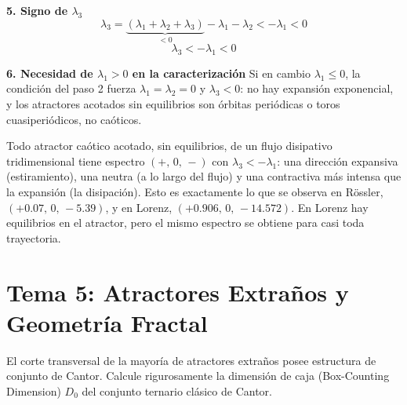 \documentclass[11pt,a4paper]{article}
\newenvironment{solucion}[1][Solución Detallada]{%
    \vspace{1.5mm}%
    \noindent{\large\textbf{Solución:}}\par\vspace{1.5mm}%
}{%
    \par\vspace{3mm}%
}
\newenvironment{conclusion}[1][Interpretación Dinámica y Conclusión]{%
    \vspace{2mm}%
    \noindent{\large\textbf{Conclusión:}}\par\vspace{1.5mm}%
}{%
    \par\vspace{3mm}%
}
\begin{document}
\begin{solucion}
\vspace{3.5mm}

\textbf{\large 5. Signo de $\lambda_3$}
\[
\lambda_3 = \underbrace{(\lambda_1 + \lambda_2 + \lambda_3)}_{<0} - \lambda_1 - \lambda_2 < -\lambda_1 < 0
\]
\[
\boxed{\lambda_3 < -\lambda_1 < 0}
\]

\vspace{3.5mm}

\textbf{\large 6. Necesidad de $\lambda_1 > 0$ en la caracterización}
Si en cambio $\lambda_1 \le 0$, la condición del paso 2 fuerza $\lambda_1 = \lambda_2 = 0$ y $\lambda_3 < 0$: no hay expansión exponencial, y los atractores acotados sin equilibrios son órbitas periódicas o toros cuasiperiódicos, no caóticos.

\end{solucion}

\begin{conclusion}
Todo atractor caótico acotado, sin equilibrios, de un flujo disipativo tridimensional tiene espectro $(+,\,0,\,-)$ con $\lambda_3 < -\lambda_1$: una dirección expansiva (estiramiento), una neutra (a lo largo del flujo) y una contractiva más intensa que la expansión (la disipación). Esto es exactamente lo que se observa en Rössler, $(+0.07,\,0,\,-5.39)$, y en Lorenz, $(+0.906,\,0,\,-14.572)$. En Lorenz hay equilibrios en el atractor, pero el mismo espectro se obtiene para casi toda trayectoria.
\end{conclusion}

\vspace{5mm}
\section*{\color{unmsmblue} Tema 5: Atractores Extraños y Geometría Fractal}

\begin{problema}[Problema 5.1]
El corte transversal de la mayoría de atractores extraños posee estructura de conjunto de Cantor. Calcule rigurosamente la dimensión de caja (Box-Counting Dimension) $D_0$ del conjunto ternario clásico de Cantor.
\end{problema}
\end{document}
